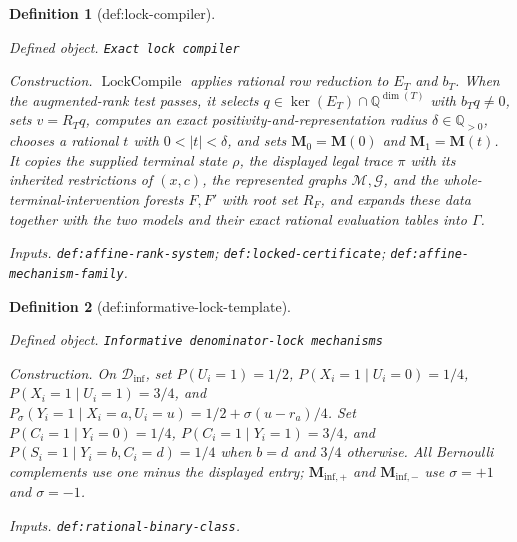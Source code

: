 \documentclass{article}
\newtheorem{definition}{Definition}
\begin{document}
\begin{definition}[def:lock-compiler]\label{def:lock-compiler}
\par\smallskip\noindent\emph{Defined object.} \texttt{Exact lock compiler}
\par\smallskip\noindent\emph{Construction.} \(\operatorname{LockCompile}\) applies rational row reduction to \(E_T\) and \(b_T\).  When the augmented-rank test passes, it selects \(q\in\ker(E_T)\cap\mathbb Q^{\dim(T)}\) with \(b_Tq\neq0\), sets \(v=R_Tq\), computes an exact positivity-and-representation radius \(\delta\in\mathbb Q_{>0}\), chooses a rational \(t\) with \(0<|t|<\delta\), and sets \(\mathbf M_0=\mathbf M(0)\) and \(\mathbf M_1=\mathbf M(t)\).  It copies the supplied terminal state \(\rho\), the displayed legal trace \(\pi\) with its inherited restrictions of \((x,c)\), the represented graphs \(\mathcal M,\mathcal G\), and the whole-terminal-intervention forests \(F,F'\) with root set \(R_F\), and expands these data together with the two models and their exact rational evaluation tables into \(\Gamma\).
\par\smallskip\noindent\emph{Inputs.} \texttt{def:\allowbreak{}affine-\allowbreak{}rank-\allowbreak{}system}; \texttt{def:\allowbreak{}locked-\allowbreak{}certificate}; \texttt{def:\allowbreak{}affine-\allowbreak{}mechanism-\allowbreak{}family}.
\end{definition}

\begin{definition}[def:informative-lock-template]\label{def:informative-lock-template}
\par\smallskip\noindent\emph{Defined object.} \texttt{Informative denominator-\allowbreak{}lock mechanisms}
\par\smallskip\noindent\emph{Construction.} On \(\mathcal D_{\mathrm{inf}}\), set \(P(U_i=1)=1/2\), \(P(X_i=1\mid U_i=0)=1/4\), \(P(X_i=1\mid U_i=1)=3/4\), and \(P_{\sigma}(Y_i=1\mid X_i=a,U_i=u)=1/2+\sigma(u-r_a)/4\). Set \(P(C_i=1\mid Y_i=0)=1/4\), \(P(C_i=1\mid Y_i=1)=3/4\), and \(P(S_i=1\mid Y_i=b,C_i=d)=1/4\) when \(b=d\) and \(3/4\) otherwise. All Bernoulli complements use one minus the displayed entry; \(\mathbf M_{\mathrm{inf},+}\) and \(\mathbf M_{\mathrm{inf},-}\) use \(\sigma=+1\) and \(\sigma=-1\).
\par\smallskip\noindent\emph{Inputs.} \texttt{def:\allowbreak{}rational-\allowbreak{}binary-\allowbreak{}class}.
\end{definition}
\end{document}
